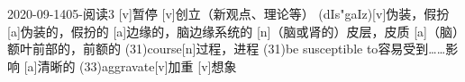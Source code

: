 \documentclass[12pt]{ctexart}
\begin{document}
\begin{wordlist}{2020-09-14}{05-阅读3}
  [v]{暂停}
  [v]{创立（新观点、理论等）}
  (dIs"gaIz)[v]{伪装，假扮}
  [a]{伪装的，假扮的}
  [a]{边缘的，脑边缘系统的}
  [n]{（脑或肾的）皮层，皮质}
  [a]{（脑）额叶前部的，前额的}
  \word(31){course}[n]{过程，进程}
  \word(31){be susceptible to}{容易受到……影响}
  [a]{清晰的}
  \word(33){aggravate}[v]{加重}
  [v]{想象}
\end{wordlist}
\end{document}
